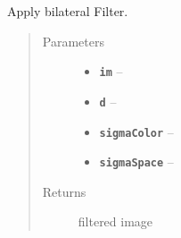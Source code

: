\documentclass[letterpaper,10pt,english]{sphinxmanual}
\begin{document}

\begin{fulllineitems}
\label{RRtoolbox.lib.arrayops:RRtoolbox.lib.arrayops.filters.bilateralFilter}
Apply bilateral Filter.
\begin{quote}\begin{description}
\item[{Parameters}] \leavevmode\begin{itemize}
\item {} 
\textbf{\texttt{im}} -- 

\item {} 
\textbf{\texttt{d}} -- 

\item {} 
\textbf{\texttt{sigmaColor}} -- 

\item {} 
\textbf{\texttt{sigmaSpace}} -- 

\end{itemize}

\item[{Returns}] \leavevmode
filtered image

\end{description}\end{quote}

\end{fulllineitems}

\end{document}
